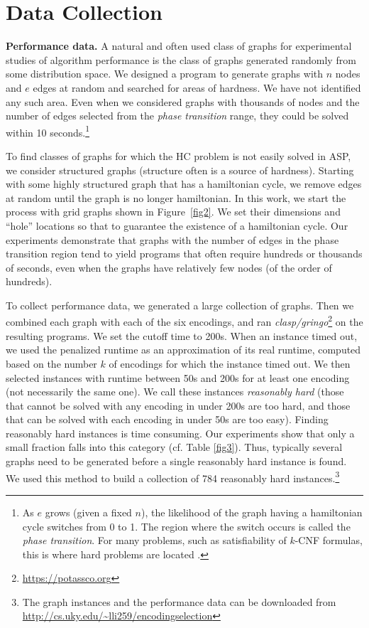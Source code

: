 \documentclass[submission,copyright,creativecommons]{eptcs}
\begin{document}
\section{Data Collection}
\textbf{Performance data.}\label{performancedata}
A natural and often used class of graphs for experimental studies of algorithm 
performance is the class of graphs generated randomly from some distribution 
space. We designed a program to generate graphs with $n$ nodes and $e$ edges
at random and searched for areas of hardness. We have not identified any such 
area. Even when we considered graphs with thousands of nodes and the number of 
edges selected from the \emph{phase transition} range, they could be solved 
within 10 seconds.\footnote{As $e$ grows (given a fixed $n$), the likelihood 
of the graph having a hamiltonian cycle switches from 0 to 1. The region where 
the switch occurs is called the \emph{phase transition}. For many problems, 
such as satisfiability of $k$-CNF formulas, this is where hard problems are 
located \cite{SelmanML96}.} 

To find classes of graphs for which the HC problem is not easily solved in ASP,
we consider structured graphs (structure often is a source of hardness). 
Starting with some highly structured graph that has a hamiltonian cycle, 
we remove edges at random until the graph is no longer hamiltonian. 
In this work, we start the process with grid graphs shown in 
Figure~\ref{fig2}. We set their dimensions and ``hole'' locations so that to 
guarantee the existence of a hamiltonian cycle. Our experiments demonstrate 
that graphs with the number of edges in the phase transition region tend to 
yield programs that often require hundreds or thousands of seconds, even 
when the graphs have relatively few nodes (of the order of hundreds).

To collect performance data, we generated a large collection of graphs. 
Then we combined each graph with each of the six encodings, and ran 
\emph{clasp/gringo}\footnote{\url{https://potassco.org}} on the resulting 
programs. We set the cutoff time to 200s. When an instance timed out, we 
used the penalized runtime as an approximation of its real runtime, computed 
based on the number $k$ of encodings for which the instance timed out.
%
We then selected instances with runtime between 50s and 200s for at least one 
encoding (not necessarily the same one). We call these instances 
\emph{reasonably hard} (those that cannot be solved with any encoding in under 
200s are too hard, and those that can be solved with each encoding in under 50s 
are too easy). Finding reasonably hard instances is time 
consuming. Our experiments show that only a small fraction falls into this
category (cf. Table \ref{fig3}). Thus, typically several graphs need to be 
generated before a single reasonably hard instance is found. We used this 
method to build a collection of 784 reasonably hard instances.\footnote{The graph instances and the performance data
can be downloaded from \url{http://cs.uky.edu/~lli259/encodingselection}}
\end{document}
